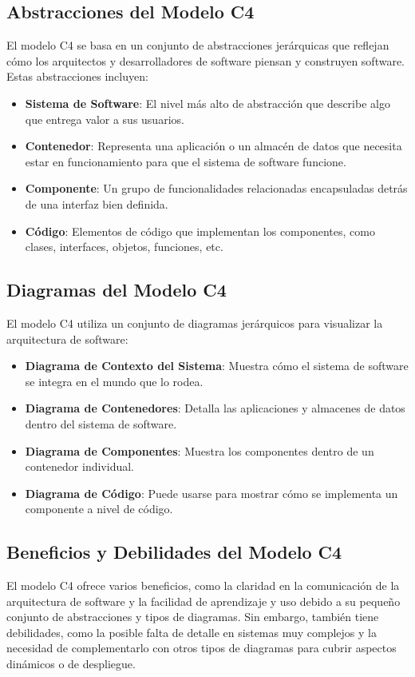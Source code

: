 \subsection{Abstracciones del Modelo C4}
El modelo C4 se basa en un conjunto de abstracciones jerárquicas que reflejan cómo los arquitectos y desarrolladores de software piensan y construyen software. Estas abstracciones incluyen:

\begin{itemize}
    \item \textbf{Sistema de Software}: El nivel más alto de abstracción que describe algo que entrega valor a sus usuarios.
    \item \textbf{Contenedor}: Representa una aplicación o un almacén de datos que necesita estar en funcionamiento para que el sistema de software funcione.
    \item \textbf{Componente}: Un grupo de funcionalidades relacionadas encapsuladas detrás de una interfaz bien definida.
    \item \textbf{Código}: Elementos de código que implementan los componentes, como clases, interfaces, objetos, funciones, etc.
\end{itemize}

\subsection{Diagramas del Modelo C4}
El modelo C4 utiliza un conjunto de diagramas jerárquicos para visualizar la arquitectura de software:

\begin{itemize}
    \item \textbf{Diagrama de Contexto del Sistema}: Muestra cómo el sistema de software se integra en el mundo que lo rodea.
    \item \textbf{Diagrama de Contenedores}: Detalla las aplicaciones y almacenes de datos dentro del sistema de software.
    \item \textbf{Diagrama de Componentes}: Muestra los componentes dentro de un contenedor individual.
    \item \textbf{Diagrama de Código}: Puede usarse para mostrar cómo se implementa un componente a nivel de código.
\end{itemize}

\subsection{Beneficios y Debilidades del Modelo C4}
El modelo C4 ofrece varios beneficios, como la claridad en la comunicación de la arquitectura de software y la facilidad de aprendizaje y uso debido a su pequeño conjunto de abstracciones y tipos de diagramas. Sin embargo, también tiene debilidades, como la posible falta de detalle en sistemas muy complejos y la necesidad de complementarlo con otros tipos de diagramas para cubrir aspectos dinámicos o de despliegue.


